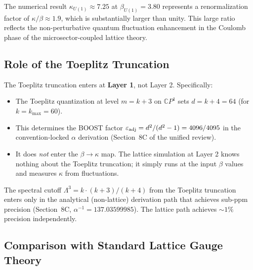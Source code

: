 The numerical result $\kappa_{U(1)} \approx 7.25$ at $\beta_{U(1)} = 3.80$
represents a renormalization factor of $\kappa/\beta \approx 1.9$, which is
substantially larger than unity. This large ratio reflects the non-perturbative
quantum fluctuation enhancement in the Coulomb phase of the microsector-coupled
lattice theory.

\subsection{Role of the Toeplitz Truncation}

The Toeplitz truncation enters at \textbf{Layer 1}, not Layer 2. Specifically:

\begin{itemize}
\item The Toeplitz quantization at level $m = k + 3$ on $\mathbb{C}P^1$ sets
      $d = k + 4 = 64$ (for $k = k_{\max} = 60$).
\item This determines the BOOST factor
      $\varepsilon_{\rm adj} = d^2/(d^2 - 1) = 4096/4095$ in the
      convention-locked $\alpha$ derivation (Section~8C of the unified review).
\item It does \emph{not} enter the $\beta \to \kappa$ map.
      The lattice simulation at Layer 2 knows nothing about the Toeplitz
      truncation; it simply runs at the input $\beta$ values and measures
      $\kappa$ from fluctuations.
\end{itemize}

The spectral cutoff $\Lambda^3 = k \cdot (k+3)/(k+4)$ from the Toeplitz
truncation enters only in the analytical (non-lattice) derivation path
that achieves sub-ppm precision (Section~8C, $\alpha^{-1} = 137.03599985$).
The lattice path achieves $\sim 1\%$ precision independently.

\subsection{Comparison with Standard Lattice Gauge Theory}

